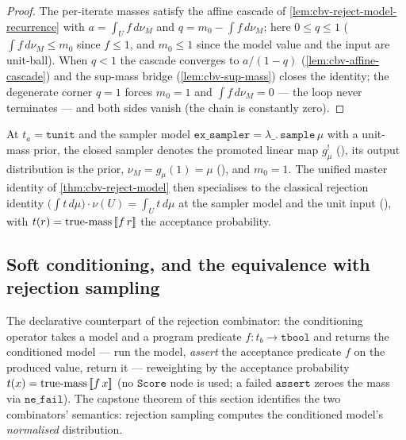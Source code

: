 \begin{proof}
The per-iterate masses satisfy the affine cascade of
\autoref{lem:cbv-reject-model-recurrence} with $a = \int_U f\,d\nu_M$ and
$q = m_0 - \int f\,d\nu_M$; here $0 \le q \le 1$ ($\int f\,d\nu_M \le m_0$ since
$f \le 1$, and $m_0 \le 1$ since the model value and the input are
unit-ball). When $q < 1$ the cascade converges to $a / (1 - q)$
(\autoref{lem:cbv-affine-cascade}) and the sup-mass bridge
(\autoref{lem:cbv-sup-mass}) closes the identity; the degenerate
corner $q = 1$ forces $m_0 = 1$ and $\int f\,d\nu_M = 0$ --- the loop never
terminates --- and both sides vanish (the chain is constantly zero).
\end{proof}

\begin{theorem}\label{thm:cbv-reject-model-instance}
\rocqok
{}\rocqok
{}\rocqok
{}
At $t_a = \mathtt{tunit}$ and the sampler model
$\mathtt{ex\_sampler} = \lambda\_.\,\mathtt{sample}\,\mu$ with a
unit-mass prior, the closed sampler denotes the promoted linear map
$g_\mu^!$ (), its
output distribution is the prior, $\nu_M = g_\mu(1) = \mu$
(), and $m_0 = 1$.
The unified master identity of \autoref{thm:cbv-reject-model} then
specialises to the classical rejection identity
$\bigl(\int t\,d\mu\bigr)\cdot \nu(U) = \int_U t\,d\mu$ at the sampler
model and the unit input
(),
with $t(r) = \mathrm{true\text{-}mass}\,[\![ f\,r ]\!]$ the acceptance
probability.
\end{theorem}

\subsection{Soft conditioning, and the equivalence with rejection
sampling}\label{ssec:cbv-condition}

The declarative counterpart of the rejection combinator: the
conditioning operator takes a model and a program predicate
$f : t_b \to \mathtt{tbool}$ and returns the conditioned model ---
run the model, \emph{assert} the acceptance predicate $f$ on the
produced value, return it --- reweighting by the acceptance
probability $t(x) = \mathrm{true\text{-}mass}\,[\![ f\,x ]\!]$ (no
$\mathtt{Score}$ node is used; a failed $\mathtt{assert}$ zeroes the
mass via $\mathtt{ne\_fail}$). The capstone theorem of
this section identifies the two combinators' semantics: rejection
sampling computes the conditioned model's \emph{normalised}
distribution.

